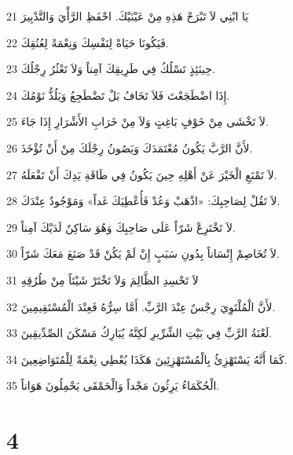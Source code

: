 \par 21 يَا ابْنِي لاَ تَبْرَحْ هَذِهِ مِنْ عَيْنَيْكَ. احْفَظِ الرَّأْيَ وَالتَّدْبِيرَ
\par 22 فَيَكُونَا حَيَاةً لِنَفْسِكَ وَنِعْمَةً لِعُنُقِكَ.
\par 23 حِينَئِذٍ تَسْلُكُ فِي طَرِيقِكَ آمِناً وَلاَ تَعْثُرُ رِجْلُكَ.
\par 24 إِذَا اضْطَجَعْتَ فَلاَ تَخَافُ بَلْ تَضْطَجِعُ وَيَلُذُّ نَوْمُكَ.
\par 25 لاَ تَخْشَى مِنْ خَوْفٍ بَاغِتٍ وَلاَ مِنْ خَرَابِ الأَشْرَارِ إِذَا جَاءَ.
\par 26 لأَنَّ الرَّبَّ يَكُونُ مُعْتَمَدَكَ وَيَصُونُ رِجْلَكَ مِنْ أَنْ تُؤْخَذَ.
\par 27 لاَ تَمْنَعِ الْخَيْرَ عَنْ أَهْلِهِ حِينَ يَكُونُ فِي طَاقَةِ يَدِكَ أَنْ تَفْعَلَهُ.
\par 28 لاَ تَقُلْ لِصَاحِبِكَ: «اذْهَبْ وَعُدْ فَأُعْطِيَكَ غَداً» وَمَوْجُودٌ عِنْدَكَ.
\par 29 لاَ تَخْتَرِعْ شَرّاً عَلَى صَاحِبِكَ وَهُوَ سَاكِنٌ لَدَيْكَ آمِناً.
\par 30 لاَ تُخَاصِمْ إِنْسَاناً بِدُونِ سَبَبٍ إِنْ لَمْ يَكُنْ قَدْ صَنَعَ مَعَكَ شَرّاً.
\par 31 لاَ تَحْسِدِ الظَّالِمَ وَلاَ تَخْتَرْ شَيْئاً مِنْ طُرُقِهِ
\par 32 لأَنَّ الْمُلْتَوِيَ رِجْسٌ عِنْدَ الرَّبِّ. أَمَّا سِرُّهُ فَعِنْدَ الْمُسْتَقِيمِينَ.
\par 33 لَعْنَةُ الرَّبِّ فِي بَيْتِ الشِّرِّيرِ لَكِنَّهُ يُبَارِكُ مَسْكَنَ الصِّدِّيقِينَ.
\par 34 كَمَا أَنَّهُ يَسْتَهْزِئُ بِالْمُسْتَهْزِئِينَ هَكَذَا يُعْطِي نِعْمَةً لِلْمُتَوَاضِعِينَ.
\par 35 الْحُكَمَاءُ يَرِثُونَ مَجْداً وَالْحَمْقَى يَحْمِلُونَ هَوَاناً.

\chapter{4}

